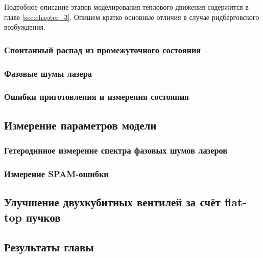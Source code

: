 Подробное описание этапов моделирования теплового движения содержится в главе \ref{sec:chapter_3}. Опишем кратко основные отличия в случае ридберговского возбуждения.


\subsubsection{Спонтанный распад из промежуточного состояния}

\subsubsection{Фазовые шумы лазера}

\subsubsection{Ошибки приготовления и измерения состояния}

\subsection{Измерение параметров модели}

\subsubsection{Гетеродинное измерение спектра фазовых шумов лазеров}



\subsubsection{Измерение SPAM-ошибки}

\subsection{Улучшение двухкубитных вентилей за счёт flat-top пучков}

\subsection{Результаты главы}


\newpage